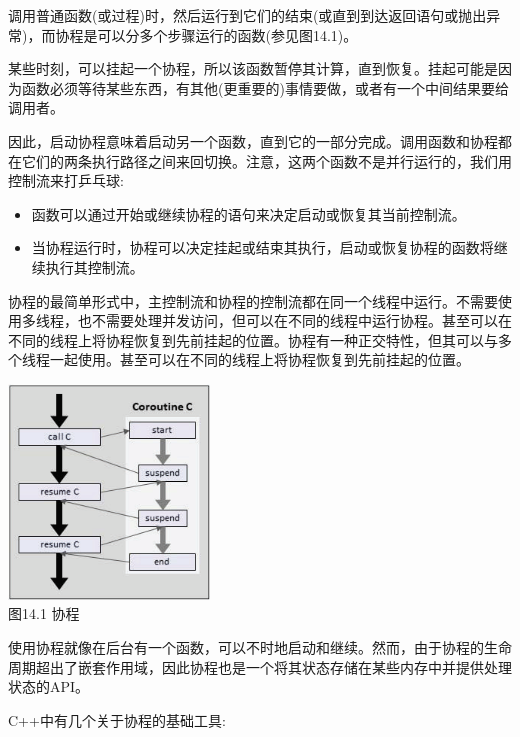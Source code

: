 调用普通函数(或过程)时，然后运行到它们的结束(或直到到达返回语句或抛出异常)，而协程是可以分多个步骤运行的函数(参见图14.1)。

某些时刻，可以挂起一个协程，所以该函数暂停其计算，直到恢复。挂起可能是因为函数必须等待某些东西，有其他(更重要的)事情要做，或者有一个中间结果要给调用者。

因此，启动协程意味着启动另一个函数，直到它的一部分完成。调用函数和协程都在它们的两条执行路径之间来回切换。注意，这两个函数不是并行运行的，我们用控制流来打乒乓球:

\begin{itemize}
\item
函数可以通过开始或继续协程的语句来决定启动或恢复其当前控制流。

\item
当协程运行时，协程可以决定挂起或结束其执行，启动或恢复协程的函数将继续执行其控制流。
\end{itemize}

协程的最简单形式中，主控制流和协程的控制流都在同一个线程中运行。不需要使用多线程，也不需要处理并发访问，但可以在不同的线程中运行协程。甚至可以在不同的线程上将协程恢复到先前挂起的位置。协程有一种正交特性，但其可以与多个线程一起使用。甚至可以在不同的线程上将协程恢复到先前挂起的位置。

\begin{center}
\includegraphics[width=0.4\textwidth]{content/chapter14/images/1.png}\\
图14.1 协程
\end{center}

使用协程就像在后台有一个函数，可以不时地启动和继续。然而，由于协程的生命周期超出了嵌套作用域，因此协程也是一个将其状态存储在某些内存中并提供处理状态的API。

C++中有几个关于协程的基础工具:

